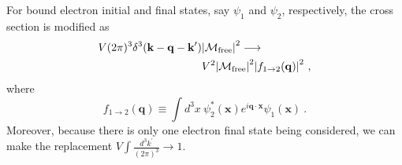 \documentclass[
    prd, twocolumn, superscriptaddress, nofootinbib, amsmath, amssymb,
    aps, floatfix,preprintnumbers
]{revtex4-2}
\begin{document}
        For bound electron initial and final states, say $\psi_1$ and $\psi_2$, respectively, the cross section is modified as
        \begin{equation}
            \begin{split}
                V (2\pi)^3 \delta^3(\mathbf{k - q  - k}^\prime) &\abs{\mathcal{M}_\mathrm{free}}^2 \longrightarrow\\ & V^2 \abs{\mathcal{M}_\mathrm{free}}^2 \abs{f_{1\rightarrow2} (\mathbf{q})}^2\ ,
            \end{split}
        \end{equation}
        where 
        \begin{equation}
            f_{1\rightarrow2} (\mathbf{q}) \equiv \int d^3x\ \psi_2^*(\mathbf{x})e^{i\mathbf{q\cdot x}}\psi_1(\mathbf{x})\ .
        \end{equation}
        Moreover, because there is only one electron final state being considered, we can make the replacement $\displaystyle V\int \frac{d^3k^\prime}{(2\pi)^3} \longrightarrow 1$. 
        
\end{document}
